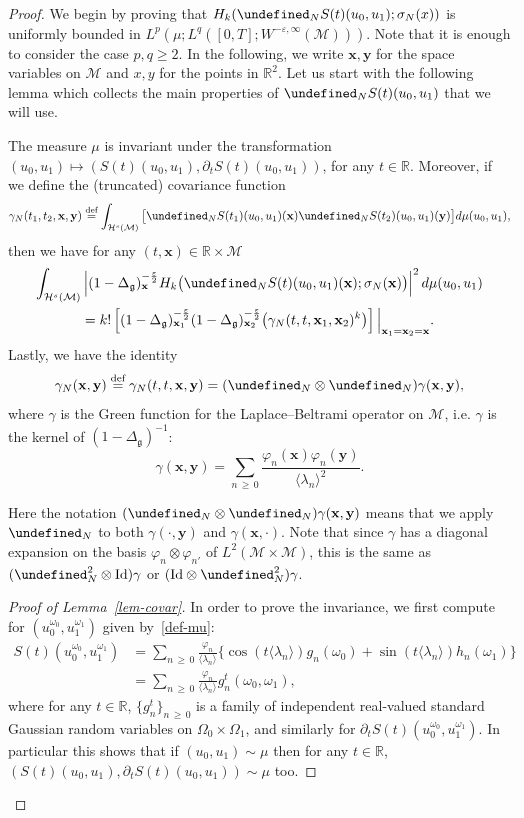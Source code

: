\documentclass[AHL,Unicode,longabstracts,published]{cedram}
\newcommand{\R}{\mathbb{R}}
\newcommand{\deff}{\overset{\textup{def}}{=}}
\let\P= \undefined
\newcommand{\P}{\mathbf{P}}
\newcommand{\x}{\mathbf{x}}
\newcommand{\y}{\mathbf{y}}
\newcommand{\M}{\mathcal{M}}
\renewcommand{\H}{\mathcal{H}}
\newcommand{\Id}{\mathrm{Id}}
\newcommand{\g}{\mathfrak{g}}
\newcommand{\ld}{\lambda}
\newcommand{\Dlg}{\Delta_{\g}}
\newcommand{\eps}{\varepsilon}
\newcommand{\s}{\sigma}
\newcommand{\dt}{\partial_t}
\renewcommand{\o}{\omega}
\renewcommand{\O}{\Omega}
\newcommand{\jb}[1] {\langle #1 \rangle}
\begin{document}
\begin{proof}
We begin by proving that $H_k(\P_NS(t)(u_0,u_1);\s_N(x))$ is uniformly bound\-ed in $L^p(\mu;L^q([0,T];W^{-\eps,\infty}(\M)))$. Note that it is enough to consider the case $p,q\ge 2$. In the following, we write $\x,\y$ for the space variables on $\M$ and $x,y$ for the points in $\R^2$. Let us start with the following lemma which collects the main properties of $\P_NS(t)(u_0,u_1)$ that we will use.

\begin{lemm}\label{lem-covar}
The measure $\mu$ is invariant under the transformation $(u_0,u_1)\mapsto (S(t)(u_0,u_1),\dt S(t)(u_0,u_1))$, for any $t\in\R$. Moreover, if we define the (truncated) covariance function
\begin{equation*}
\gamma_N(t_1,t_2,\x,\y)
\deff\int_{\H^s(\M)}\big[\P_NS(t_1)(u_0,u_1)(\x)\P_NS(t_2)(u_0,u_1)(\y)\big]d\mu(u_0,u_1),
\end{equation*}
then we have for any $(t,\x)\in \R\times\M$
\begin{multline}\label{keypoint}
\int_{\H^s(\M)}\left|(1-\Dlg)_\x^{-\frac\eps2}H_k\big(\P_NS(t)(u_0,u_1)(\x);\s_N(\x)\big)\right|^2d\mu(u_0,u_1)\\ 
=k!\left[(1-\Dlg)_{\x_1}^{-\frac\eps2}(1-\Dlg)_{\x_2}^{-\frac\eps2}\big(\gamma_N(t,t,\x_1,\x_2)^k\big)\right]\Big|_{\x_1=\x_2=\x}.
\end{multline}
Lastly, we have the identity
\begin{equation}\label{covarGreen}
\gamma_N(\x,\y)
\deff\gamma_N(t,t,\x,\y) = (\P_N\otimes\P_N)\gamma(\x,\y),
\end{equation}
where $\gamma$ is the Green function for the Laplace--Beltrami operator on $\M$, i.e. $ \gamma$ is the kernel of $(1-\Dlg)^{-1}$:
\begin{equation*}
\gamma(\x,\y)=\sum_{n\,\ge\,0}\frac{\varphi_n(\x)\varphi_n(\y)}{\jb{\ld_n}^2}.
\end{equation*}
\end{lemm}

Here the notation $(\P_N\otimes\P_N)\gamma(\x,\y)$ means that we apply $\P_N$ to both $\gamma(\cdot,\y)$ and $\gamma(\x,\cdot)$. Note that since $\gamma$ has a diagonal expansion on the basis $\varphi_n\otimes\varphi_{n'}$ of $L^2(\M\times\M)$, this is the same as $(\P_N^2\otimes\Id)\gamma$ or $(\Id\otimes\P_N^2)\gamma$.
\begin{proof}[Proof of Lemma~\ref{lem-covar}]
In order to prove the invariance, we first compute for $(u_0^{\o_0},u_1^{\o_1})$ given by~\eqref{def-mu}:
\begin{align*}
S(t)\left(u_0^{\o_0},u_1^{\o_1}\right) &= \sum_{n\,\geq\,0}\frac{\varphi_n}{\jb{\lambda_n}}\big\{\cos(t\jb{\lambda_n})g_n(\o_0)+\sin(t\jb{\lambda_n})h_n(\o_1)\big\}\\
&=\sum_{n\,\geq\,0}\frac{\varphi_n}{\jb{\lambda_n}}g_n^t(\o_0,\o_1),
\end{align*}
where for any $t\in\R$, $\{g_n^t\}_{n\,\ge\,0}$ is a family of independent real-valued standard Gaussian random variables on $\O_0\times\O_1$, and similarly for $\dt S(t)(u_0^{\o_0},u_1^{\o_1})$. In particular this shows that if $(u_0,u_1)\sim \mu$ then for any $t\in\R$, $(S(t)(u_0,u_1),\dt S(t)(u_0,u_1))\sim\mu$ too.


\end{proof}
\end{proof}
\end{document}
